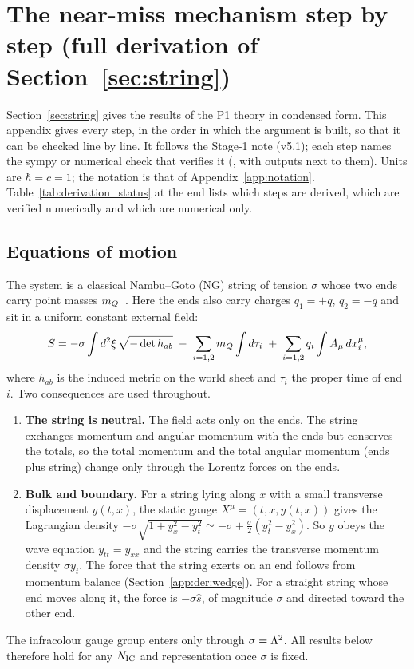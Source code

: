 \section{The near-miss mechanism step by step (full derivation of Section~\ref{sec:string})}\label{app:derivation}

Section~\ref{sec:string} gives the results of the P1 theory in condensed form. This appendix gives every step, in the
order in which the argument is built, so that it can be checked line by line. It follows the Stage-1 note
 (v5.1); each step names the sympy or numerical check that verifies it
(, with outputs next to them). Units are $\hbar=c=1$; the notation is that of
Appendix~\ref{app:notation}. Table~\ref{tab:derivation_status} at the end lists which steps are derived, which are
verified numerically and which are numerical only.

\subsection{Equations of motion}\label{app:der:eom}
The system is a classical Nambu--Goto (NG) string of tension $\sigma$ whose two ends carry point masses $m_Q$~\cite{Kang:2008ea}. Here the ends also carry
charges $q_1=+q$, $q_2=-q$ and sit in a uniform constant external field:
\begin{equation}
  S=-\sigma\int d^2\xi\,\sqrt{-\det h_{ab}}\;-\;\sum_{i=1,2}m_Q\int d\tau_i\;+\;\sum_{i=1,2}q_i\int A_\mu\,dx_i^\mu ,
  \label{eq:D:action}
\end{equation}
where $h_{ab}$ is the induced metric on the world sheet and $\tau_i$ the proper time of end $i$. Two consequences are
used throughout.
\begin{enumerate}
\item \textbf{The string is neutral.} The field acts only on the ends. The string exchanges momentum and angular momentum
  with the ends but conserves the totals, so the total momentum and the total angular momentum (ends plus string) change
  only through the Lorentz forces on the ends.
\item \textbf{Bulk and boundary.} For a string lying along $x$ with a small transverse displacement $y(t,x)$, the static
  gauge $X^\mu=(t,x,y(t,x))$ gives the Lagrangian density $-\sigma\sqrt{1+y_x^2-y_t^2}\simeq-\sigma+\tfrac{\sigma}{2}(y_t^2-y_x^2)$.
  So $y$ obeys the wave equation $y_{tt}=y_{xx}$ and the string carries the transverse momentum density $\sigma y_t$.
  The force that the string exerts on an end follows from momentum balance (Section~\ref{app:der:wedge}). For a straight
  string whose end moves along it, the force is $-\sigma\hat s$, of magnitude $\sigma$ and directed toward the other end.
\end{enumerate}
The infracolour gauge group enters only through $\sigma=\Lambda^2$. All results below therefore hold for any $N_{\rm IC}$
and representation once $\sigma$ is fixed.

